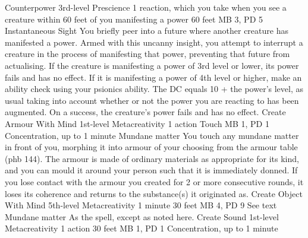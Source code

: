 \DndPowerHeader%
    {Counterpower\label{pwr:counterpower}}
    {3rd-level Prescience}
    {1 reaction, which you take when you see a creature
within 60 feet of you manifesting a power
}
    {60 feet}
    {MB 3, PD 5}
    {Instantaneous}
    {Sight}
You briefly peer into a future where another creature
has manifested a power. Armed with this uncanny insight,
you attempt to interrupt a creature in the process of
manifesting that power, preventing that future from actualising.
If the creature is manifesting a power
of 3rd level or lower, its power fails and has no effect.
If it is manifesting a power of 4th level or higher,
make an ability check using your psionics ability.
The DC equals 10 + the power's level, as usual taking into account
whether or not the power you are reacting to has been augmented.
On a success, the creature's power fails and has no effect.
\DndPowerHeader%
    {Create Armour With Mind\label{pwr:create-armour-with-mind}}
    {1st-level Metacreativity}
    {1 action}
    {Touch}
    {MB 1, PD 1}
    {Concentration, up to 1 minute}
    {Mundane matter}
You touch any mundane matter in front of
you, morphing it into armour of your choosing from the armour
table (phb 144). The armour is made of ordinary materials
as appropriate for its kind, and you can mould it around your person
such that it is immediately donned.
If you lose contact with the armour you created for 2
or more consecutive rounds, it loses its coherence and returns
to the substance(s) it originated as.
\DndPowerHeader%
    {Create Object With Mind\label{pwr:create-object-with-mind}}
    {5th-level Metacreativity}
    {1 minute}
    {30 feet}
    {MB 4, PD 9}
    {See text}
    {Mundane matter}
As the  spell, except as
noted here.
\DndPowerHeader%
    {Create Sound\label{pwr:create-sound}}
    {1st-level Metacreativity}
    {1 action}
    {30 feet}
    {MB 1, PD 1}
    {Concentration, up to 1 minute}
